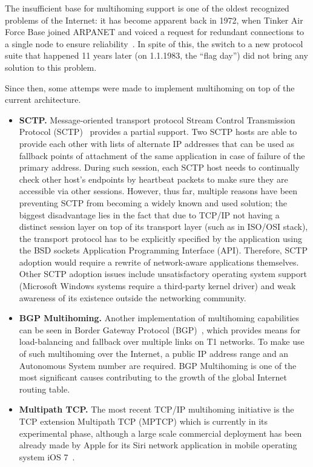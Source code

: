         The insufficient base for multihoming support is one of the oldest recognized problems of the Internet: it has become apparent back in 1972, when Tinker Air Force Base joined ARPANET and voiced a request for redundant connections to a single node to ensure reliability~\cite{Patterns}. In spite of this, the switch to a new protocol suite that happened 11 years later (on 1.1.1983, the ``flag day'') did not bring any solution to this problem.

        Since then, some attemps were made to implement multihoming on top of the current architecture.

        \begin{itemize}
            \item \textbf{SCTP.}
            Message-oriented transport protocol Stream Control Transmission Protocol (SCTP)~\cite{rfc4960} provides a partial support. Two SCTP hosts are able to provide each other with lists of alternate IP addresses that can be used as fallback points of attachment of the same application in case of failure of the primary address. During such session, each SCTP host needs to continually check other host's endpoints by heartbeat packets to make sure they are accessible via other sessions.
            However, thus far, multiple reasons have been preventing SCTP from becoming a widely known and used solution; the biggest disadvantage lies in the fact that due to TCP/IP not having a distinct session layer on top of its transport layer (such as in ISO/OSI stack), the transport protocol has to be explicitly specified by the application using the BSD sockets Application Programming Interface (API). Therefore, SCTP adoption would require a rewrite of network-aware applications themselves. Other SCTP adoption issues include unsatisfactory operating system support (Microsoft Windows systems require a third-party kernel driver) and weak awareness of its existence outside the networking community.

            \item \textbf{BGP Multihoming.} Another implementation of multihoming capabilities can be seen in Border Gateway Protocol (BGP)~\cite{rfc4271}, which provides means for load-balancing and fallback over multiple links on T1 networks. To make use of such multihoming over the Internet, a public IP address range and an Autonomous System number are required. BGP Multihoming is one of the most significant causes contributing to the growth of the global Internet routing table.

            \item \textbf{Multipath TCP.} The most recent TCP/IP multihoming initiative is the TCP extension Multipath TCP (MPTCP) which is currently in its experimental phase, although a large scale commercial deployment has been already made by Apple for its Siri network application in mobile operating system iOS 7~\cite{Apple_MP}.
        \end{itemize}

